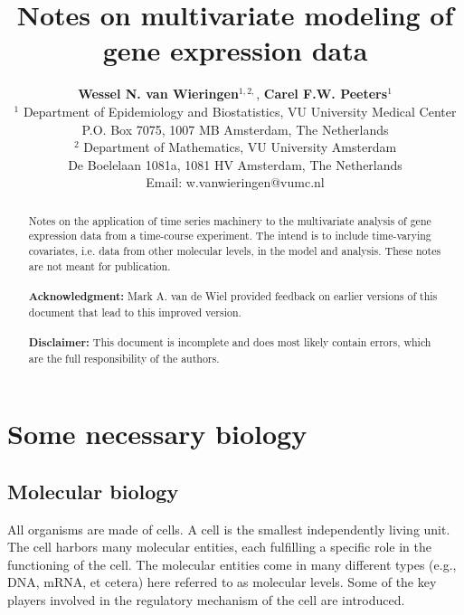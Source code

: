 \documentclass[a4paper]{article}
\title{Notes on multivariate modeling of gene expression data}
\author{ {\small
\textbf{Wessel N. van Wieringen}$^{1,2,}$,  \textbf{Carel F.W. Peeters}$^1$}
\\
{\small $^1$ Department of Epidemiology and Biostatistics, VU University Medical Center}
\\
{\small P.O. Box 7075, 1007 MB Amsterdam, The Netherlands}
\\
{\small $^2$ Department of Mathematics, VU University Amsterdam}
\\
{\small De Boelelaan 1081a, 1081 HV Amsterdam, The Netherlands}
\\
{\small Email: w.vanwieringen@vumc.nl}
}
\date{}
\theoremstyle{myexamplestyle}
\begin{document}
\maketitle


\begin{abstract}
\noindent
Notes on the application of time series machinery to the multivariate analysis of gene expression data from a time-course experiment. The intend is to include time-varying covariates, i.e. data from other molecular levels, in the model and analysis. These notes are not meant for publication.
\\
\\
\textbf{Acknowledgment:} Mark A. van de Wiel provided feedback on earlier versions of this document that lead to this improved version.
\\
\\
\textbf{Disclaimer:} This document is incomplete and does most likely contain errors, which are the full responsibility of the authors.
\end{abstract}

\newpage
\tableofcontents

\newpage
\section{Some necessary biology}
\subsection{Molecular biology}
All organisms are made of cells. A cell is the smallest independently living unit. The cell harbors many molecular entities, each fulfilling a specific role in the functioning of the cell. The molecular entities come in many different types (e.g., DNA, mRNA, et cetera) here referred to as molecular levels. Some of the key players involved in the regulatory mechanism of the cell are introduced.
\end{document}
